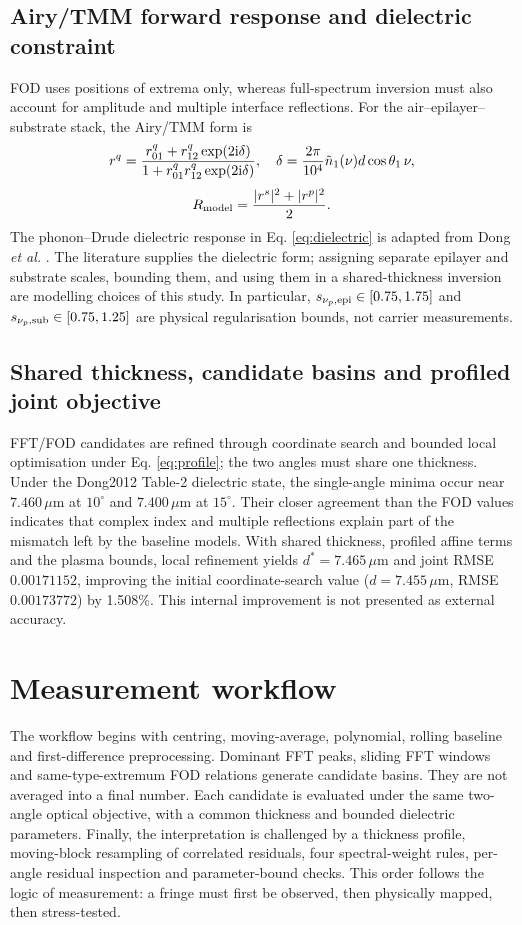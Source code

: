 \documentclass[10pt,a4paper]{article}
\newcommand{\um}{\ensuremath{\mu\mathrm{m}}}
\begin{document}
\subsection{Airy/TMM forward response and dielectric constraint}
FOD uses positions of extrema only, whereas full-spectrum inversion must also account for amplitude and multiple interface reflections. For the air--epilayer--substrate stack, the Airy/TMM form \cite{Troparevsky2010} is
\begin{equation}
r^q=\frac{r^q_{01}+r^q_{12}\exp(2{\rm i}\delta)}
{1+r^q_{01}r^q_{12}\exp(2{\rm i}\delta)},\quad
\delta=\frac{2\pi}{10^4}\tilde n_1(\nu)d\cos\theta_1\,\nu,
\end{equation}
\begin{equation}
R_{\rm model}=\frac{|r^s|^2+|r^p|^2}{2}.
\label{eq:tmm}
\end{equation}
The phonon--Drude dielectric response in Eq. \eqref{eq:dielectric} is adapted from Dong \textit{et al.} \cite{Dong2012}. The literature supplies the dielectric form; assigning separate epilayer and substrate scales, bounding them, and using them in a shared-thickness inversion are modelling choices of this study. In particular, $s_{\nu_p,\rm epi}\in[0.75,1.75]$ and $s_{\nu_p,\rm sub}\in[0.75,1.25]$ are physical regularisation bounds, not carrier measurements.

\subsection{Shared thickness, candidate basins and profiled joint objective}
FFT/FOD candidates are refined through coordinate search and bounded local optimisation under Eq. \eqref{eq:profile}; the two angles must share one thickness. Under the Dong2012 Table-2 dielectric state, the single-angle minima occur near $7.460\,\um$ at $10^\circ$ and $7.400\,\um$ at $15^\circ$. Their closer agreement than the FOD values indicates that complex index and multiple reflections explain part of the mismatch left by the baseline models. With shared thickness, profiled affine terms and the plasma bounds, local refinement yields $d^*=7.465\,\um$ and joint RMSE $0.00171152$, improving the initial coordinate-search value ($d=7.455\,\um$, RMSE $0.00173772$) by 1.508\%. This internal improvement is not presented as external accuracy.

\section{Measurement workflow}
The workflow begins with centring, moving-average, polynomial, rolling baseline and first-difference preprocessing. Dominant FFT peaks, sliding FFT windows and same-type-extremum FOD relations generate candidate basins. They are not averaged into a final number. Each candidate is evaluated under the same two-angle optical objective, with a common thickness and bounded dielectric parameters. Finally, the interpretation is challenged by a thickness profile, moving-block resampling of correlated residuals, four spectral-weight rules, per-angle residual inspection and parameter-bound checks. This order follows the logic of measurement: a fringe must first be observed, then physically mapped, then stress-tested.
\end{document}
